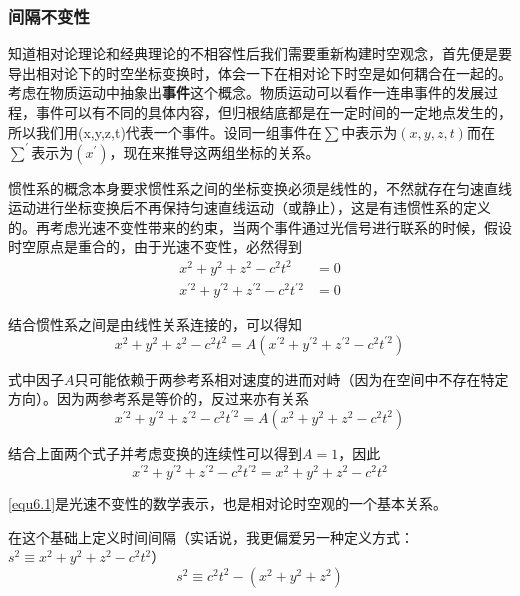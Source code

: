 \documentclass[UTF8]{ctexart}
\begin{document}
    \subsubsection{间隔不变性}
    知道相对论理论和经典理论的不相容性后我们需要重新构建时空观念，首先便是要导出相对论下的时空坐标变换时，体会一下在相对论下时空是如何耦合在一起的。考虑在物质运动中抽象出\textbf{事件}这个概念。物质运动可以看作一连串事件的发展过程，事件可以有不同的具体内容，但归根结底都是在一定时间的一定地点发生的，所以我们用(x,y,z,t)代表一个事件。设同一组事件在$\sum$中表示为$(x,y,z,t)$而在$\sum^{\prime}$表示为$(x^{\prime})$，现在来推导这两组坐标的关系。

    惯性系的概念本身要求惯性系之间的坐标变换必须是线性的，不然就存在匀速直线运动进行坐标变换后不再保持匀速直线运动（或静止），这是有违惯性系的定义的。再考虑光速不变性带来的约束，当两个事件通过光信号进行联系的时候，假设时空原点是重合的，由于光速不变性，必然得到
    \begin{equation}
    \begin{aligned}
        x^2 +y^2 +z^2 -c^2 t^2 &=0 \\
        x^{\prime2} +y^{\prime2} + z^{\prime2} - c^2 t^{\prime2} &= 0
    \end{aligned}
    \end{equation}

\noindent 结合惯性系之间是由线性关系连接的，可以得知
\begin{equation}
    x^2 +y^2 +z^2 -c^2 t^2 = A (x^{\prime2} +y^{\prime2} + z^{\prime2} - c^2 t^{\prime2})
\end{equation}

\noindent 式中因子$A$只可能依赖于两参考系相对速度的进而对峙（因为在空间中不存在特定方向）。因为两参考系是等价的，反过来亦有关系
\begin{equation}
    x^{\prime2} +y^{\prime2} + z^{\prime2} - c^2 t^{\prime2} = A (x^2 +y^2 +z^2 -c^2 t^2)
\end{equation}

\noindent 结合上面两个式子并考虑变换的连续性可以得到$A=1$，因此
\begin{equation}
    x^{\prime2} +y^{\prime2} + z^{\prime2} - c^2 t^{\prime2} = x^2 +y^2 +z^2 -c^2 t^2 \label{equ6.1}
\end{equation}

\noindent \autoref{equ6.1}是光速不变性的数学表示，也是相对论时空观的一个基本关系。

    在这个基础上定义时间间隔（实话说，我更偏爱另一种定义方式：$s^2 \equiv x^2+y^2+z^2 - c^2 t^2$）
    \begin{equation}
        s^2 \equiv c^2 t^2 -(x^2 +y^2 +z^2)
    \end{equation}
\end{document}

